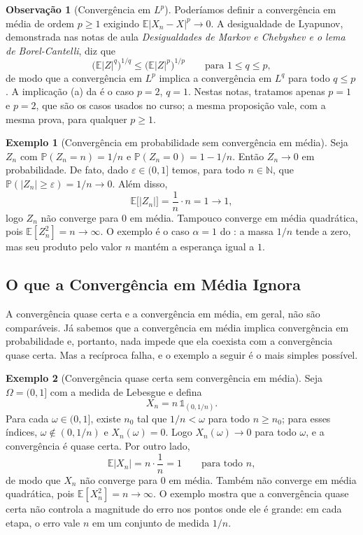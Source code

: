 \documentclass[12pt,portuguese]{article}
\theoremstyle{definition}
\newtheorem{example}[example]{Exemplo}
\newtheorem{remark}[remark]{Observação}
\theoremstyle{plainexercise}
\theoremstyle{starredexercise}
\theoremstyle{definition}
\begin{document}
\begin{remark}[Convergência em $L^p$]\label{rem:lp}
Poderíamos definir a convergência em média de ordem $p\geqslant1$ exigindo
$\mathbb{E}|X_n-X|^p\to0$.
A desigualdade de Lyapunov, demonstrada nas notas de aula
\emph{Desigualdades de Markov e Chebyshev e o lema de Borel-Cantelli}, diz que
\[
\bigl(\mathbb{E}|Z|^q\bigr)^{1/q}
\leqslant
\bigl(\mathbb{E}|Z|^p\bigr)^{1/p}
\qquad\text{para }1\leqslant q\leqslant p,
\]
de modo que a convergência em $L^p$ implica a convergência em $L^q$ para todo
$q\leqslant p$. A implicação (a) da  é o caso $p=2$, $q=1$.
Nestas notas, tratamos apenas $p=1$ e $p=2$, que são os casos usados no curso; a
mesma proposição vale, com a mesma prova, para qualquer $p\geqslant1$.
\end{remark}

\begin{example}[Convergência em probabilidade sem convergência em média]
\label{ex:prob-sem-media}
Seja $Z_n$ com $\mathbb{P}(Z_n=n)=1/n$ e $\mathbb{P}(Z_n=0)=1-1/n$. Então
$Z_n\to0$ em probabilidade. De fato, dado $\varepsilon\in(0,1]$ temos,
para todo $n\in\mathbb{N}$, que $\mathbb{P}(|Z_n|\geqslant\varepsilon)=1/n\to0$.
Além disso,
\[
\mathbb{E}\bigl[|Z_n|\bigr]=\frac{1}{n}\cdot n=1\longrightarrow1,
\]
logo $Z_n$ não converge para $0$ em média. Tampouco converge em média quadrática,
pois $\mathbb{E}[Z_n^2]=n\to\infty$. O exemplo é o caso $\alpha=1$ do
: a massa $1/n$ tende a zero, mas seu produto
pelo valor $n$ mantém a esperança igual a $1$.
\end{example}

\subsection{O que a Convergência em Média Ignora}\label{subsec:medias-contraexemplos}

A convergência quase certa e a convergência em média, em geral, não são comparáveis. Já
sabemos que a convergência em média implica convergência em probabilidade e,
portanto, nada impede que ela coexista com a convergência quase certa. Mas a
recíproca falha, e o exemplo a seguir é o mais simples possível.

\begin{example}[Convergência quase certa sem convergência em média]
\label{ex:qc-sem-media}
Seja $\Omega=(0,1]$ com a medida de Lebesgue e defina
\[
X_n=n\,\mathds{1}_{(0,1/n)}.
\]
Para cada $\omega\in(0,1]$, existe $n_0$ tal que $1/n<\omega$ para todo
$n\geqslant n_0$; para esses índices, $\omega\notin(0,1/n)$ e $X_n(\omega)=0$.
Logo $X_n(\omega)\to0$ para todo $\omega$, e a convergência é quase certa. Por
outro lado,
\[
\mathbb{E}|X_n|=n\cdot\frac{1}{n}=1
\qquad\text{para todo }n,
\]
de modo que $X_n$ não converge para $0$ em média. Também não converge em média
quadrática, pois $\mathbb{E}[X_n^2]=n\to\infty$. O exemplo mostra que a
convergência quase certa não controla a magnitude do erro nos pontos onde ele é
grande: em cada etapa, o erro vale $n$ em um conjunto de medida $1/n$.
\end{example}
\end{document}
